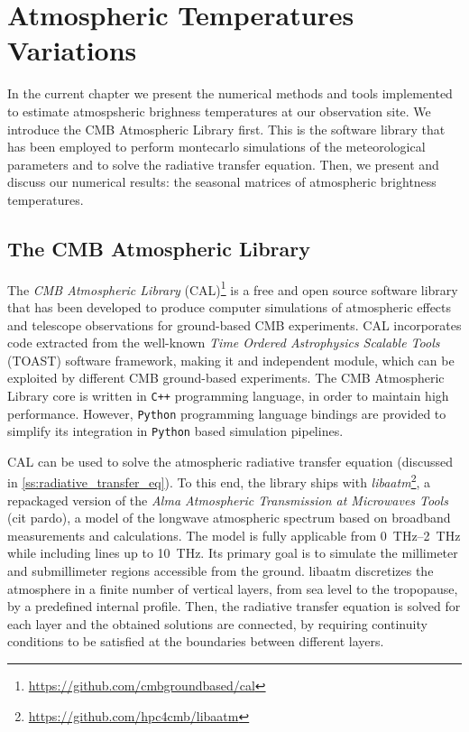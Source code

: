 \chapter{Atmospheric Temperatures Variations}\label{ch:atm_variations}

In the current chapter we present the numerical methods and tools
implemented to estimate atmospsheric brighness temperatures at our
observation site. We introduce the CMB Atmospheric Library first. This is
the software library that has been employed to perform montecarlo
simulations of the meteorological parameters and to solve the radiative
transfer equation. Then, we present and discuss our numerical results: the
seasonal matrices of atmospheric brightness temperatures.

\section{The CMB Atmospheric Library}

The \emph{CMB Atmospheric Library}
(CAL)\footnote{\url{https://github.com/cmbgroundbased/cal}} is a free and
open source software library that has been developed to produce computer
simulations of atmospheric effects and telescope observations for
ground-based CMB experiments. CAL incorporates code extracted from the
well-known \emph{Time Ordered Astrophysics Scalable Tools} (TOAST) software
framework, making it and independent module, which can be exploited by
different CMB ground-based experiments. The CMB Atmospheric Library core is
written in \texttt{C++} programming language, in order to maintain high
performance.  However, \texttt{Python} programming language bindings are
provided to simplify its integration in \texttt{Python} based simulation
pipelines.

CAL can be used to solve the atmospheric radiative transfer equation
(discussed in \autoref{ss:radiative_transfer_eq}). To this end, the library
ships with
\emph{libaatm}\footnote{\url{https://github.com/hpc4cmb/libaatm}}, a
repackaged version of the \emph{Alma Atmospheric Transmission at Microwaves
Tools} (cit pardo), a model of the longwave atmospheric spectrum based on
broadband measurements and calculations. The model is fully applicable from
\SIrange{0}{2}{\tera\hertz} while including lines up to
\SI{10}{\tera\hertz}. Its primary goal is to simulate the millimeter and
submillimeter regions accessible from the ground.  libaatm discretizes the
atmosphere in a finite number of vertical layers, from sea level to the
tropopause, by a predefined internal profile. Then, the radiative transfer
equation is solved for each layer and the obtained solutions are connected,
by requiring continuity conditions to be satisfied at the boundaries
between different layers.


